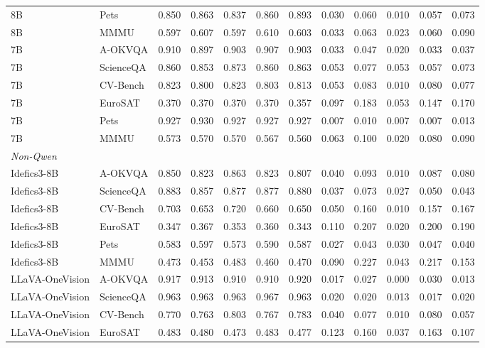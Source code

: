\begin{tabular}{llrrrrr rrrrr}
8B & Pets & 0.850 & 0.863 & 0.837 & 0.860 & 0.893 & 0.030 & 0.060 & 0.010 & 0.057 & 0.073 \\
8B & MMMU & 0.597 & 0.607 & 0.597 & 0.610 & 0.603 & 0.033 & 0.063 & 0.023 & 0.060 & 0.090 \\
7B & A-OKVQA & 0.910 & 0.897 & 0.903 & 0.907 & 0.903 & 0.033 & 0.047 & 0.020 & 0.033 & 0.037 \\
7B & ScienceQA & 0.860 & 0.853 & 0.873 & 0.860 & 0.863 & 0.053 & 0.077 & 0.053 & 0.057 & 0.073 \\
7B & CV-Bench & 0.823 & 0.800 & 0.823 & 0.803 & 0.813 & 0.053 & 0.083 & 0.010 & 0.080 & 0.077 \\
7B & EuroSAT & 0.370 & 0.370 & 0.370 & 0.370 & 0.357 & 0.097 & 0.183 & 0.053 & 0.147 & 0.170 \\
7B & Pets & 0.927 & 0.930 & 0.927 & 0.927 & 0.927 & 0.007 & 0.010 & 0.007 & 0.007 & 0.013 \\
7B & MMMU & 0.573 & 0.570 & 0.570 & 0.567 & 0.560 & 0.063 & 0.100 & 0.020 & 0.080 & 0.090 \\
\midrule
\multicolumn{12}{l}{\textit{Non-Qwen}} \\
Idefics3-8B & A-OKVQA & 0.850 & 0.823 & 0.863 & 0.823 & 0.807 & 0.040 & 0.093 & 0.010 & 0.087 & 0.080 \\
Idefics3-8B & ScienceQA & 0.883 & 0.857 & 0.877 & 0.877 & 0.880 & 0.037 & 0.073 & 0.027 & 0.050 & 0.043 \\
Idefics3-8B & CV-Bench & 0.703 & 0.653 & 0.720 & 0.660 & 0.650 & 0.050 & 0.160 & 0.010 & 0.157 & 0.167 \\
Idefics3-8B & EuroSAT & 0.347 & 0.367 & 0.353 & 0.360 & 0.343 & 0.110 & 0.207 & 0.020 & 0.200 & 0.190 \\
Idefics3-8B & Pets & 0.583 & 0.597 & 0.573 & 0.590 & 0.587 & 0.027 & 0.043 & 0.030 & 0.047 & 0.040 \\
Idefics3-8B & MMMU & 0.473 & 0.453 & 0.483 & 0.460 & 0.470 & 0.090 & 0.227 & 0.043 & 0.217 & 0.153 \\
LLaVA-OneVision & A-OKVQA & 0.917 & 0.913 & 0.910 & 0.910 & 0.920 & 0.017 & 0.027 & 0.000 & 0.030 & 0.013 \\
LLaVA-OneVision & ScienceQA & 0.963 & 0.963 & 0.963 & 0.967 & 0.963 & 0.020 & 0.020 & 0.013 & 0.017 & 0.020 \\
LLaVA-OneVision & CV-Bench & 0.770 & 0.763 & 0.803 & 0.767 & 0.783 & 0.040 & 0.077 & 0.010 & 0.080 & 0.057 \\
LLaVA-OneVision & EuroSAT & 0.483 & 0.480 & 0.473 & 0.483 & 0.477 & 0.123 & 0.160 & 0.037 & 0.163 & 0.107 \\

\end{tabular}

